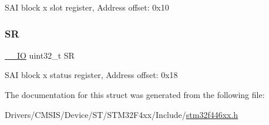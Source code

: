 S\+AI block x slot register, Address offset\+: 0x10 \mbox{\label{struct_s_a_i___block___type_def_af6aca2bbd40c0fb6df7c3aebe224a360}} 
\subsubsection{\texorpdfstring{SR}{SR}}
{\footnotesize\ttfamily \mbox{\hyperlink{core__sc300_8h_aec43007d9998a0a0e01faede4133d6be}{\+\_\+\+\_\+\+IO}} uint32\+\_\+t SR}

S\+AI block x status register, Address offset\+: 0x18 

The documentation for this struct was generated from the following file\+:\begin{DoxyCompactItemize}
\item 
Drivers/\+C\+M\+S\+I\+S/\+Device/\+S\+T/\+S\+T\+M32\+F4xx/\+Include/\mbox{\hyperlink{stm32f446xx_8h}{stm32f446xx.\+h}}\end{DoxyCompactItemize}
